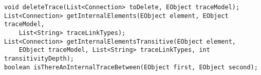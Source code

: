 


\begin{lstlisting}[caption={AbstractMetaModelAdapter interface},
label=lst:timapi2,
style=mystylexcore,
frame=shadowbox, 
rulesepcolor=\color{blue},
morekeywords={class,contains,abstract,extends,\{,\},\[,\],refers,derived,String,get,int,double,List,Connection,EObject,void,String,boolean,Collection,EClass},
linewidth=17.5cm,
xleftmargin=0.3cm
]
void deleteTrace(List<Connection> toDelete, EObject traceModel);
List<Connection> getInternalElements(EObject element, EObject traceModel, 
    List<String> traceLinkTypes);
List<Connection> getInternalElementsTransitive(EObject element, 
    EObject traceModel, List<String> traceLinkTypes, int transitivityDepth);
boolean isThereAnInternalTraceBetween(EObject first, EObject second);
\end{lstlisting}





